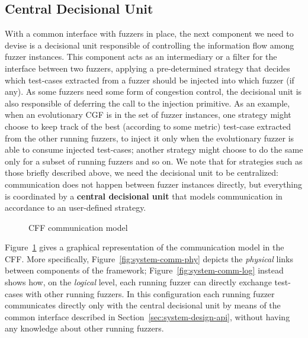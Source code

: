 \subsection{Central Decisional Unit}
With a common interface with fuzzers in place, the next component we need to
devise is a decisional unit responsible of controlling the information flow
among fuzzer instances. This component acts as an intermediary or a filter for
the interface between two fuzzers, applying a pre-determined strategy that
decides which test-cases extracted from a fuzzer should be injected into which
fuzzer (if any). As some fuzzers need some form of congestion control, the
decisional unit is also responsible of deferring the call to the injection
primitive. As an example, when an evolutionary \ac{CGF} is in the set of fuzzer
instances, one strategy might choose to keep track of the best (according to
some metric) test-case extracted from the other running fuzzers, to inject it
only when the evolutionary fuzzer is able to consume injected test-cases;
another strategy might choose to do the same only for a subset of running
fuzzers and so on. We note that for strategies such as those briefly described
above, we need the decisional unit to be centralized: communication does not
happen between fuzzer instances directly, but everything is coordinated by a
\textbf{central decisional unit} that models communication in accordance to an
user-defined strategy.

\begin{figure}
    \centering
    \qquad
\caption{\acl{CFF} communication model}
\label{fig:system-comm}
\end{figure}

Figure~\ref{fig:system-comm} gives a graphical representation of the
communication model in the \ac{CFF}. More specifically,
Figure~\ref{fig:system-comm-phy} depicts the \emph{physical} links between
components of the framework; Figure~\ref{fig:system-comm-log} instead shows how,
on the \emph{logical} level, each running fuzzer can directly exchange
test-cases with other running fuzzers. In this configuration each running fuzzer
communicates directly only with the central decisional unit by means of the
common interface described in Section~\ref{sec:system-design-api}, without
having any knowledge about other running fuzzers.

